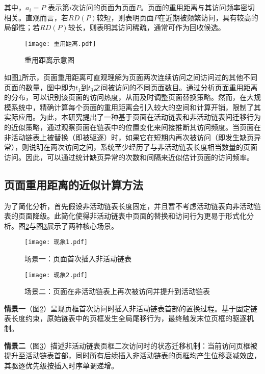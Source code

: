 其中，\(a_i=P\) 表示第\(i\)次访问的页面为页面\(P\)。页面的重用距离与其访问频率密切相关。直观而言，若\(RD(P)\)较短，则表明页面\(P\)在近期被频繁访问，具有较高的局部性；若\(RD(P)\)较长，则表明其访问稀疏，通常可作为回收候选。

\begin{figure}[htbp]
  \centering
  \texttt{[image: 重用距离.pdf]}
  \caption{重用距离示意图}
  \label{fig:refault_distance}
\end{figure}


如图\ref{fig:refault_distance}所示，页面重用距离可直观理解为页面两次连续访问之间访问过的其他不同页面的数量，图中即为\(t_1\)到\(t_3\)之间被访问的不同页面数目。通过分析页面重用距离的分布，可以识别该页面的访问热度，从而及时调整页面替换策略。然而，在大规模系统中，精确计算每个页面的重用距离会引入较大的空间和计算开销，限制了其实际应用。为此，本研究提出了一种基于页面在活动链表和非活动链表间迁移行为的近似策略，通过观察页面在链表中的位置变化来间接推断其访问频度。当页面在非活动链表上被替换（即被驱逐）时，如果它在短期内再次被访问（即发生缺页异常），则说明在两次访问之间，系统至少经历了与非活动链表长度相当数量的页面访问。因此，可以通过统计缺页异常的次数和间隔来近似估计页面的访问频率。

\subsection{页面重用距离的近似计算方法}
\label{sec:重用距离的近似推导}
为了简化分析，首先假设非活动链表长度固定，并且暂不考虑活动链表向非活动链表的页面降级。此简化使得非活动链表中页面的替换和访问行为更易于形式化分析。图\ref{fig:现象1}与图\ref{fig:现象2}展示了两种核心场景。

\begin{figure}[htbp]
  \centering
  \texttt{[image: 现象1.pdf]}
  \caption{场景一：页面首次插入非活动链表}
  \label{fig:现象1}
\end{figure}

\begin{figure}[htbp]
  \centering
  \texttt{[image: 现象2.pdf]}
  \caption{场景二：页面在非活动链表上再次被访问并提升到活动链表}
  \label{fig:现象2}
\end{figure}

\textbf{情景一}（图\ref{fig:现象1}）呈现页框首次访问时插入非活动链表首部的置换过程。基于固定链表长度约束，原始链表中的页框发生全局尾移行为，最终触发末位页框的驱逐机制。

\textbf{情景二}（图\ref{fig:现象2}）描述非活动链表页框二次访问时的状态迁移机制：当前访问页框被提升至活动链表首部，同时所有后续插入非活动链表的页框均产生位移衰减效应，其驱逐优先级按插入时序单调递增。

